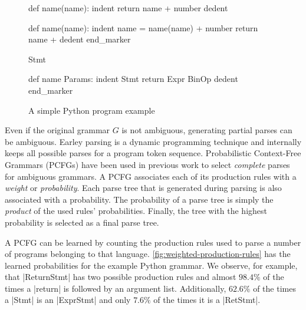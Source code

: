 \begin{figure}[t]
\centering
\begin{minipage}[t]{0.56\linewidth}
\centering
\begin{ecode}
def name(name): \n
indent return name + number \n
dedent \n

def name(name): \n
indent name = name(name) + number \n
return name + \n
dedent end_marker
\end{ecode}
\label{fig:prog-seq}
\end{minipage}%
\hspace{0.02\linewidth}%
\begin{minipage}[t]{0.42\linewidth}
\centering
\begin{ecode}
Stmt \n

def name Params: \n
indent Stmt \n
return Expr BinOp \n
dedent end_marker
\end{ecode}
\label{fig:abstract-prog-seq}
\end{minipage}
\caption{A simple Python program example}
\end{figure}

Even if the original grammar $G$ is not ambiguous, generating partial parses can
be ambiguous. Earley parsing is a dynamic programming technique and internally
keeps all possible parses for a program token sequence. Probabilistic
Context-Free Grammars (PCFGs) have been used in previous work
\citep{Collins_2013, Jelinek_1992} to select \emph{complete} parses for
ambiguous grammars. A PCFG associates each of its production rules with a
\emph{weight} or \emph{probability}. Each parse tree that is generated during
parsing is also associated with a probability. The probability of a parse tree
is simply the \emph{product} of the used rules' probabilities. Finally, the tree
with the highest probability is selected as a final parse tree.

A PCFG can be learned \citep{Collins_2013} by counting the production
rules used to parse a number of programs belonging to that language.
\autoref{fig:weighted-production-rules} has the learned probabilities for the
example Python grammar. We observe, for example, that |ReturnStmt| has two
possible production rules and almost $98.4\%$ of the times a |return| is
followed by an argument list. Additionally, $62.6\%$ of the times a |Stmt| is an
|ExprStmt| and only $7.6\%$ of the times it is a |RetStmt|.

